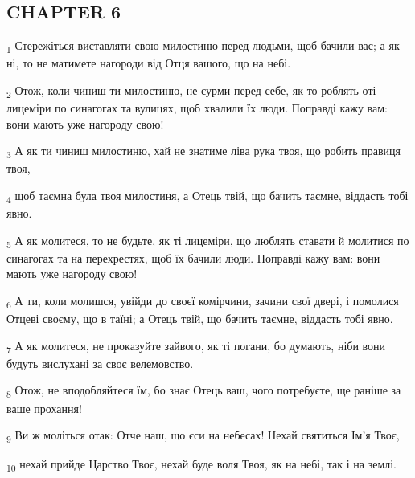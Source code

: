 \subsection{CHAPTER 6}
\begin{tcolorbox}
\textsubscript{1} Стережіться виставляти свою милостиню перед людьми, щоб бачили вас; а як ні, то не матимете нагороди від Отця вашого, що на небі.
\end{tcolorbox}
\begin{tcolorbox}
\textsubscript{2} Отож, коли чиниш ти милостиню, не сурми перед себе, як то роблять оті лицеміри по синагогах та вулицях, щоб хвалили їх люди. Поправді кажу вам: вони мають уже нагороду свою!
\end{tcolorbox}
\begin{tcolorbox}
\textsubscript{3} А як ти чиниш милостиню, хай не знатиме ліва рука твоя, що робить правиця твоя,
\end{tcolorbox}
\begin{tcolorbox}
\textsubscript{4} щоб таємна була твоя милостиня, а Отець твій, що бачить таємне, віддасть тобі явно.
\end{tcolorbox}
\begin{tcolorbox}
\textsubscript{5} А як молитеся, то не будьте, як ті лицеміри, що люблять ставати й молитися по синагогах та на перехрестях, щоб їх бачили люди. Поправді кажу вам: вони мають уже нагороду свою!
\end{tcolorbox}
\begin{tcolorbox}
\textsubscript{6} А ти, коли молишся, увійди до своєї комірчини, зачини свої двері, і помолися Отцеві своєму, що в таїні; а Отець твій, що бачить таємне, віддасть тобі явно.
\end{tcolorbox}
\begin{tcolorbox}
\textsubscript{7} А як молитеся, не проказуйте зайвого, як ті погани, бо думають, ніби вони будуть вислухані за своє велемовство.
\end{tcolorbox}
\begin{tcolorbox}
\textsubscript{8} Отож, не вподобляйтеся їм, бо знає Отець ваш, чого потребуєте, ще раніше за ваше прохання!
\end{tcolorbox}
\begin{tcolorbox}
\textsubscript{9} Ви ж моліться отак: Отче наш, що єси на небесах! Нехай святиться Ім'я Твоє,
\end{tcolorbox}
\begin{tcolorbox}
\textsubscript{10} нехай прийде Царство Твоє, нехай буде воля Твоя, як на небі, так і на землі.
\end{tcolorbox}

